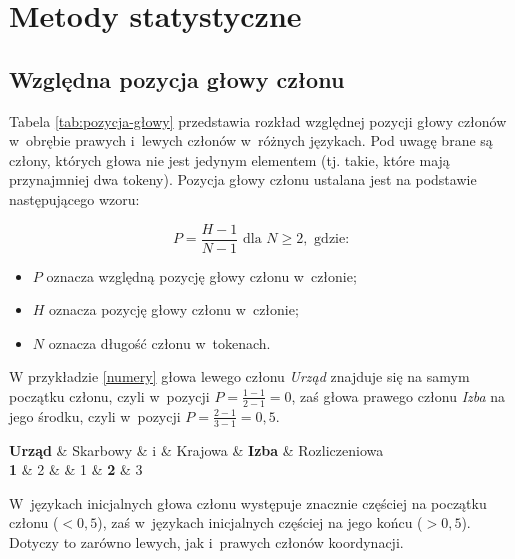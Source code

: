 \chapter{Metody statystyczne} \label{ch5}

\section{Względna pozycja głowy członu}



Tabela \ref{tab:pozycja-głowy} przedstawia rozkład względnej pozycji głowy członów w~obrębie prawych i~lewych członów w~różnych językach. Pod uwagę brane są człony, których głowa nie jest jedynym elementem (tj. takie, które mają przynajmniej dwa tokeny). Pozycja głowy członu ustalana jest na podstawie następującego wzoru:

\[
P = \frac{H-1}{N-1} \text{ dla } N\geq2, \text{ gdzie:}
\]

\begin{itemize}
\item $P$ oznacza względną pozycję głowy członu w~członie;
\item $H$ oznacza pozycję głowy członu w~członie;
\item $N$ oznacza długość członu w~tokenach.
\end{itemize}

W przykładzie \eqref{numery} głowa lewego członu \textit{Urząd} znajduje się na samym początku członu, czyli w~pozycji $P=\frac{1-1}{2-1}=0$, zaś głowa prawego członu \textit{Izba} na jego środku, czyli w~pozycji $P=\frac{2-1}{3-1}=0{,}5$.

\begin{exe}
\ex \label{numery}
\begin{dependency}[theme=simple, baseline=0.5ex]
\begin{deptext}
\textbf{Urząd} \& Skarbowy \& i \& Krajowa \& \textbf{Izba} \&  Rozliczeniowa \\
\scriptsize \textbf{1} \& \scriptsize 2 \&   \& \scriptsize 1 \& \scriptsize \textbf{2} \& \scriptsize 3 \\
\end{deptext}
\end{dependency}
\end{exe}

W~językach inicjalnych głowa członu występuje znacznie częściej na początku członu ($<0{,}5$), zaś w~językach inicjalnych częściej na jego końcu ($>0{,}5$). Dotyczy to zarówno lewych, jak i~prawych członów koordynacji.


